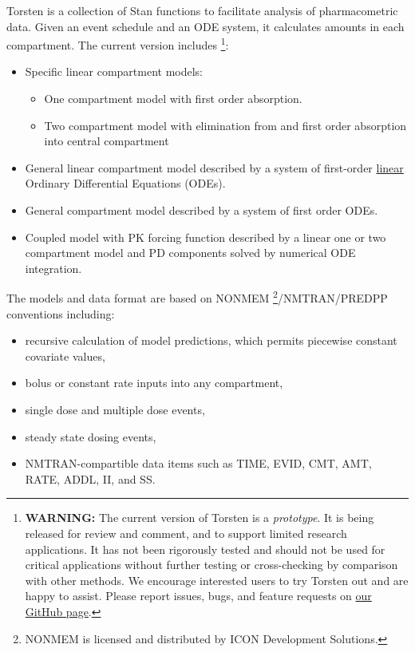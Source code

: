 \documentclass[12pt, reqno, oneside]{amsbook}
\numberwithin{equation}{chapter}
\numberwithin{figure}{chapter}
\numberwithin{table}{chapter}
\theoremstyle{remark}
\begin{document}
Torsten is a collection of Stan functions to facilitate analysis of
pharmacometric data. Given an event schedule and an ODE system, it calculates amounts
in each compartment. The current version includes \footnote{\textbf{WARNING:} The current version of Torsten is a \emph{prototype}. It is being released for review and comment, and to support limited research applications. It has not been rigorously tested and should not be used for critical applications without further testing or cross-checking by comparison with other methods. We encourage interested users to try Torsten out and are happy to assist. Please report issues, bugs, and feature requests on \href{https://github.com/metrumresearchgroup/stan}{our GitHub page}.}:
\begin{itemize}
\item Specific linear compartment models:
\begin{itemize}
\item One compartment model with first order absorption.
\item Two compartment model with elimination from and first order absorption into central compartment
\end{itemize}
\item General linear compartment model described by a system of first-order \uline{linear} Ordinary Differential Equations (ODEs).
\item General compartment model described by a system of first order ODEs.
\item Coupled model with PK forcing function described by a linear one or two compartment model and PD components solved by numerical ODE integration.
\end{itemize}

The models and data format are based on
NONMEM \textregistered{} \footnote{NONMEM\textregistered{} is licensed and distributed by ICON Development Solutions.}/NMTRAN/PREDPP
conventions including:
\begin{itemize}
\item recursive calculation of model predictions, which permits piecewise constant covariate values,
\item bolus or constant rate inputs into any compartment,
\item single dose and multiple dose events,
\item steady state dosing events,
\item NMTRAN-compartible data items such as TIME, EVID, CMT, AMT, RATE, ADDL, II, and SS.
\end{itemize}
\end{document}
